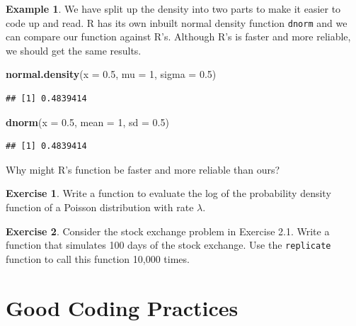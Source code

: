 \documentclass[
]{book}
\newenvironment{Shaded}{\begin{snugshade}}{\end{snugshade}}
\newcommand{\AttributeTok}[1]{\textcolor[rgb]{0.13,0.29,0.53}{#1}}
\newcommand{\DecValTok}[1]{\textcolor[rgb]{0.00,0.00,0.81}{#1}}
\newcommand{\FloatTok}[1]{\textcolor[rgb]{0.00,0.00,0.81}{#1}}
\newcommand{\FunctionTok}[1]{\textcolor[rgb]{0.13,0.29,0.53}{\textbf{#1}}}
\newcommand{\NormalTok}[1]{#1}
\theoremstyle{definition}
\theoremstyle{definition}
\newtheorem{example}{Example}[chapter]
\theoremstyle{definition}
\newtheorem{exercise}{Exercise}[chapter]
\theoremstyle{definition}
\theoremstyle{remark}
\begin{document}
\begin{example}
We have split up the density into two parts to make it easier to code up and read. R has its own inbuilt normal density function \texttt{dnorm} and we can compare our function against R's. Although R's is faster and more reliable, we should get the same results.

\begin{Shaded}
\begin{Highlighting}[]
\FunctionTok{normal.density}\NormalTok{(}\AttributeTok{x =} \FloatTok{0.5}\NormalTok{, }\AttributeTok{mu =} \DecValTok{1}\NormalTok{, }\AttributeTok{sigma =} \FloatTok{0.5}\NormalTok{)}
\end{Highlighting}
\end{Shaded}

\begin{verbatim}
## [1] 0.4839414
\end{verbatim}

\begin{Shaded}
\begin{Highlighting}[]
\FunctionTok{dnorm}\NormalTok{(}\AttributeTok{x =} \FloatTok{0.5}\NormalTok{, }\AttributeTok{mean =} \DecValTok{1}\NormalTok{, }\AttributeTok{sd =} \FloatTok{0.5}\NormalTok{)}
\end{Highlighting}
\end{Shaded}

\begin{verbatim}
## [1] 0.4839414
\end{verbatim}

Why might R's function be faster and more reliable than ours?
\end{example}

\begin{exercise}
Write a function to evaluate the log of the probability density function of a Poisson distribution with rate \(\lambda\).
\end{exercise}

\begin{exercise}
Consider the stock exchange problem in Exercise 2.1. Write a function that simulates 100 days of the stock exchange. Use the \texttt{replicate} function to call this function 10,000 times.
\end{exercise}

\hypertarget{good-coding-practices}{%
\section{Good Coding Practices}\label{good-coding-practices}}
\end{document}
